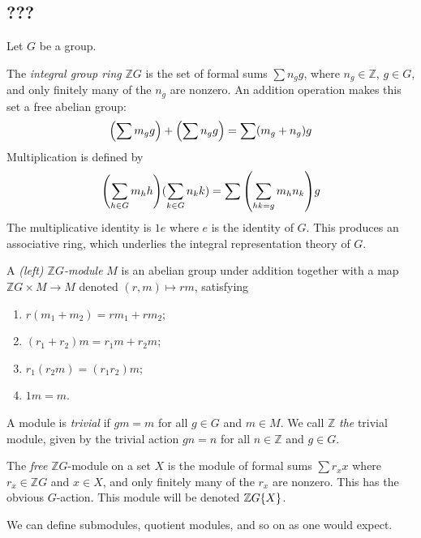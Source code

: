 \subsection{???}
Let \( G \) be a group.
\begin{definition}
    The \emph{integral group ring} \( \mathbb Z G \) is the set of formal sums \( \sum n_g g \), where \( n_g \in \mathbb Z \), \( g \in G \), and only finitely many of the \( n_g \) are nonzero.
    An addition operation makes this set a free abelian group:
    \[ \qty(\sum m_g g) + \qty(\sum n_g g) = \sum (m_g + n_g) g \]
    Multiplication is defined by
    \[ \qty(\sum_{h \in G} m_h h)(\sum_{k \in G} n_k k) = \sum \qty(\sum_{hk = g} m_h n_k) g \]
    The multiplicative identity is \( 1 e \) where \( e \) is the identity of \( G \).
    This produces an associative ring, which underlies the integral representation theory of \( G \).
\end{definition}
\begin{definition}
    A \emph{(left) \( \mathbb Z G \)-module} \( M \) is an abelian group under addition together with a map \( \mathbb Z G \times M \to M \) denoted \( (r, m) \mapsto rm \), satisfying
    \begin{enumerate}
        \item \( r(m_1 + m_2) = rm_1 + rm_2 \);
        \item \( (r_1 + r_2)m = r_1 m + r_2 m \);
        \item \( r_1(r_2 m) = (r_1 r_2) m \);
        \item \( 1 m = m \).
    \end{enumerate}
\end{definition}
A module is \emph{trivial} if \( gm = m \) for all \( g \in G \) and \( m \in M \).
We call \( \mathbb Z \) \emph{the} trivial module, given by the trivial action \( gn = n \) for all \( n \in \mathbb Z \) and \( g \in G \).

The \emph{free} \( \mathbb Z G \)-module on a set \( X \) is the module of formal sums \( \sum r_x x \) where \( r_x \in \mathbb Z G \) and \( x \in X \), and only finitely many of the \( r_x \) are nonzero.
This has the obvious \( G \)-action.
This module will be denoted \( \mathbb Z G\qty{X} \).

We can define submodules, quotient modules, and so on as one would expect.

